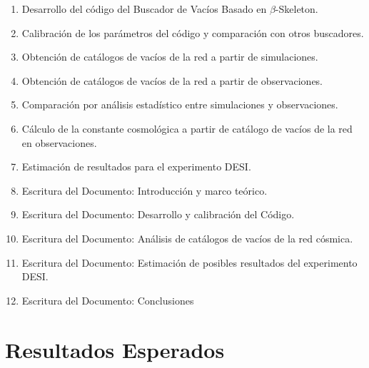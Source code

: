 \documentclass[preprint]{aastex62}
\begin{document}
  
  \begin{enumerate}
  \item Desarrollo del código del Buscador de Vacíos Basado en $\beta$-Skeleton.
  \item Calibración de los parámetros del código y comparación con otros buscadores.
  \item Obtención de catálogos de vacíos de la red a partir de simulaciones.
  \item Obtención de catálogos de vacíos de la red a partir de observaciones.
  \item Comparación por análisis estadístico entre simulaciones y observaciones.
  \item Cálculo de la constante cosmológica a partir de catálogo de vacíos de la red en
    observaciones.
  \item Estimación de resultados para el experimento DESI.
  \item Escritura del Documento: Introducción y marco teórico.
  \item Escritura del Documento: Desarrollo y calibración del Código.
  \item Escritura del Documento: Análisis de catálogos de vacíos de la red cósmica. 
  \item Escritura del Documento: Estimación de posibles resultados del experimento DESI.
  \item Escritura del Documento: Conclusiones
  \end{enumerate}
  
  
  \section{Resultados Esperados}

  
    
  \nocite{*}
\end{document}
